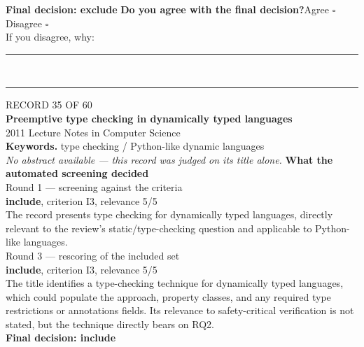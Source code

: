\documentclass[11pt,a4paper]{article}
\begin{document}
{\small\textbf{Final decision: exclude}}
\vspace{2mm}
{\small\textbf{Do you agree with the final decision?}\quad{}Agree $\square$\qquad{}Disagree $\square$}\\[1mm]
{\footnotesize\color{soft}If you disagree, why:}\\[1mm]
\color{rule}\rule{\linewidth}{0.3pt}\\[3mm]\rule{\linewidth}{0.3pt}\color{black}
\clearpage
{\color{soft}\footnotesize RECORD 35 OF 60}\\[1mm]
{\large\bfseries Preemptive type checking in dynamically typed languages}\\[1.5mm]
{\color{soft}\small 2011 \textperiodcentered{} Lecture Notes in Computer Science}\\[2mm]
{\small\textbf{Keywords.} type checking / Python-like dynamic languages}\\[2mm]
{\small\itshape\color{soft}No abstract available --- this record was judged on its title alone.}
\vspace{3mm}
\vspace{2.5mm}
{\small\textbf{What the automated screening decided}}\\[2mm]
{\footnotesize\color{soft}Round 1 --- screening against the criteria}\\[0.5mm]
{\small\textbf{include}, criterion I3, relevance 5/5}\\[0.5mm]
{\small The record presents type checking for dynamically typed languages, directly relevant to the review's static/type-checking question and applicable to Python-like languages.}\\[2.5mm]
{\footnotesize\color{soft}Round 3 --- rescoring of the included set}\\[0.5mm]
{\small\textbf{include}, criterion I3, relevance 5/5}\\[0.5mm]
{\small The title identifies a type-checking technique for dynamically typed languages, which could populate the approach, property classes, and any required type restrictions or annotations fields. Its relevance to safety-critical verification is not stated, but the technique directly bears on RQ2.}\\[2.5mm]
{\small\textbf{Final decision: include}}
\vspace{2mm}
\end{document}
